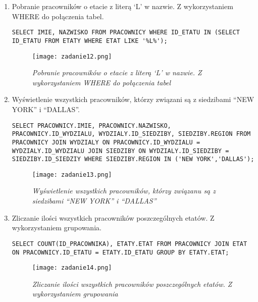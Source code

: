 \documentclass[a4paper, 10pt]{article}
\begin{document}
\begin{enumerate}
\item Pobranie pracowników o etacie z literą `L' w nazwie. Z wykorzystaniem WHERE do połączenia tabel. 
\begin{lstlisting}[style=SQL, caption=\textit{Pobranie pracowników o etacie z literą `L' w nazwie. Z wykorzystaniem WHERE do połączenia tabel}]
SELECT IMIE, NAZWISKO FROM PRACOWNICY WHERE ID_ETATU IN (SELECT ID_ETATU FROM ETATY WHERE ETAT LIKE '%L%');
\end{lstlisting}

\begin{figure}[H]
	\centering
	\texttt{[image: zadanie12.png]}
	\caption{\textit{Pobranie pracowników o etacie z literą `L' w nazwie. Z wykorzystaniem WHERE do połączenia tabel}}
\end{figure}


\item Wyświetlenie wszystkich pracowników, którzy związani są z siedzibami ``NEW YORK'' i ``DALLAS''. 
\begin{lstlisting}[style=SQL, caption=\textit{Wyświetlenie wszystkich pracowników, którzy związani są z siedzibami ``NEW YORK'' i ``DALLAS''}]
SELECT PRACOWNICY.IMIE, PRACOWNICY.NAZWISKO, PRACOWNICY.ID_WYDZIALU, WYDZIALY.ID_SIEDZIBY, SIEDZIBY.REGION FROM PRACOWNICY JOIN WYDZIALY ON PRACOWNICY.ID_WYDZIALU = WYDZIALY.ID_WYDZIALU JOIN SIEDZIBY ON WYDZIALY.ID_SIEDZIBY = SIEDZIBY.ID_SIEDZIY WHERE SIEDZIBY.REGION IN ('NEW YORK','DALLAS');
\end{lstlisting}

\begin{figure}[H]
	\centering
	\texttt{[image: zadanie13.png]}
	\caption{\textit{Wyświetlenie wszystkich pracowników, którzy związanu są z siedzibami ``NEW YORK'' i ``DALLAS''}}
\end{figure}


\item Zliczanie ilości wszystkich pracowników poszczególnych etatów. Z wykorzystaniem grupowania. 
\begin{lstlisting}[style=SQL, caption=\textit{Zliczanie ilości wszystkich pracowników poszczególnych etatów. Z wykorzystaniem grupowania}]
SELECT COUNT(ID_PRACOWNIKA), ETATY.ETAT FROM PRACOWNICY JOIN ETAT ON PRACOWNICY.ID_ETATU = ETATY.ID_ETATU GROUP BY ETATY.ETAT;
\end{lstlisting}

\begin{figure}[H]
	\centering
	\texttt{[image: zadanie14.png]}
	\caption{\textit{Zliczanie ilości wszystkich pracowników poszczególnych etatów. Z wykorzystaniem grupowania}}
\end{figure}



\end{enumerate}
\end{document}
